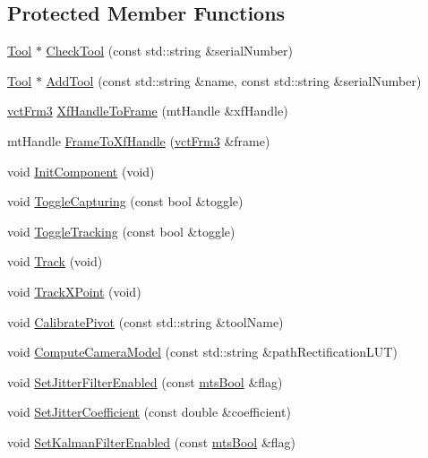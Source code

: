 \subsection*{Protected Member Functions}
\begin{DoxyCompactItemize}
\item 
\hyperlink{classmts_micron_tracker_1_1_tool}{Tool} $\ast$ \hyperlink{classmts_micron_tracker_adc762fa38ce5b3e17ca2a3e5fb0b0a2f}{Check\+Tool} (const std\+::string \&serial\+Number)
\item 
\hyperlink{classmts_micron_tracker_1_1_tool}{Tool} $\ast$ \hyperlink{classmts_micron_tracker_a37185584e886acc8eb0c64a0f0df6db1}{Add\+Tool} (const std\+::string \&name, const std\+::string \&serial\+Number)
\item 
\hyperlink{vct_transformation_types_8h_a81feda0a02c2d1bc26e5553f409fed20}{vct\+Frm3} \hyperlink{classmts_micron_tracker_a16293b87d3b8279bc47f0b14436ab675}{Xf\+Handle\+To\+Frame} (mt\+Handle \&xf\+Handle)
\item 
mt\+Handle \hyperlink{classmts_micron_tracker_a6834e7f374015273b69c271be84ef979}{Frame\+To\+Xf\+Handle} (\hyperlink{vct_transformation_types_8h_a81feda0a02c2d1bc26e5553f409fed20}{vct\+Frm3} \&frame)
\item 
void \hyperlink{classmts_micron_tracker_abe43aa3d73c585e9a770ae36dbe96e5e}{Init\+Component} (void)
\item 
void \hyperlink{classmts_micron_tracker_a418289b9dceaa16fd75e7d9d552f73b4}{Toggle\+Capturing} (const bool \&toggle)
\item 
void \hyperlink{classmts_micron_tracker_a366ff39dc5527beef64cb7be010e4331}{Toggle\+Tracking} (const bool \&toggle)
\item 
void \hyperlink{classmts_micron_tracker_a65d559a278d31edb4221d2c2c6a5318e}{Track} (void)
\item 
void \hyperlink{classmts_micron_tracker_a6c94408f53045f9e2675c4c22886e226}{Track\+X\+Point} (void)
\item 
void \hyperlink{classmts_micron_tracker_af7ec93da8da972d08ea95a401fd44571}{Calibrate\+Pivot} (const std\+::string \&tool\+Name)
\item 
void \hyperlink{classmts_micron_tracker_a591af1616ff00127d8b3ff4532193dd0}{Compute\+Camera\+Model} (const std\+::string \&path\+Rectification\+L\+U\+T)
\item 
void \hyperlink{classmts_micron_tracker_a0f575ab025ad605f79976bc1093c79d0}{Set\+Jitter\+Filter\+Enabled} (const \hyperlink{mts_generic_object_proxy_8h_ae2e26261f1874d4aa4ee374ece7646bd}{mts\+Bool} \&flag)
\item 
void \hyperlink{classmts_micron_tracker_a7185deb821ff2365d8fa91b5484a935a}{Set\+Jitter\+Coefficient} (const double \&coefficient)
\item 
void \hyperlink{classmts_micron_tracker_adb8a22a24b5339817407ecf14f93a7e3}{Set\+Kalman\+Filter\+Enabled} (const \hyperlink{mts_generic_object_proxy_8h_ae2e26261f1874d4aa4ee374ece7646bd}{mts\+Bool} \&flag)
\end{DoxyCompactItemize}
